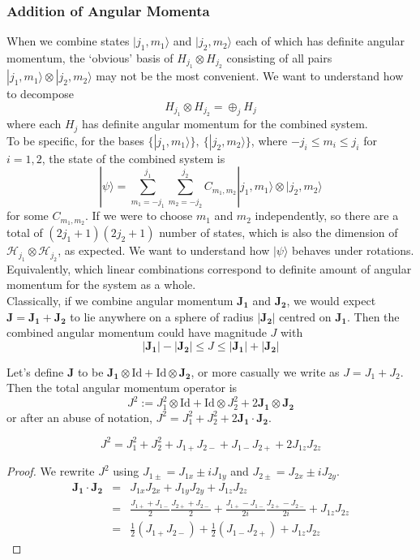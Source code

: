 \documentclass[a4paper]{article}
\begin{document}
\subsubsection*{Addition of Angular Momenta}
When we combine states $|j_1,m_1\rangle$ and $|j_2,m_2\rangle$ each of which has definite angular momentum, the `obvious' basis of $H_{j_1}\otimes H_{j_2}$ consisting of all pairs $|j_1,m_1\rangle\otimes|j_2,m_2\rangle$ may not be the most convenient. We want to understand how to decompose $$H_{j_1}\otimes H_{j_2}=\oplus_jH_j$$ where each $H_j$ has definite angular momentum for the combined system.\\[5pt]
To be specific, for the bases  $\{|j_1,m_1\rangle\},~\{|j_2,m_2\rangle\}$, where $-j_i\leq m_i\leq j_i$ for $i=1,2$, the state of the combined system is
$$|\psi\rangle=\sum_{m_1=-j_1}^{j_1}\sum_{m_2=-j_2}^{j_2}C_{m_1,m_2}|j_1,m_1\rangle\otimes|j_2,m_2\rangle$$
for some $C_{m_1,m_2}$. If we were to choose $m_1$ and $m_2$ independently, so there are a total of $(2j_1+1)(2j_2+1)$ number of states, which is also the dimension of $\mathcal{H}_{j_1}\otimes\mathcal{H}_{j_2}$, as expected. We want to understand how $|\psi\rangle$ behaves under rotations. Equivalently, which linear combinations correspond to definite amount of angular momentum for the system as a whole.\\[5pt]
Classically, if we combine angular momentum $\mathbf{J_1}$ and $\mathbf{J_2}$, we would expect $\mathbf{J}=\mathbf{J_1}+\mathbf{J_2}$ to lie anywhere on a sphere of radius $|\mathbf{J_2}|$ centred on $\mathbf{J_1}$. Then the combined angular momentum could have magnitude $J$ with
$$|\mathbf{J_1}|-|\mathbf{J_2}|\leq J\leq|\mathbf{J_1}|+|\mathbf{J_2}|$$
\begin{defi}
Let's define $\mathbf{J}$ to be $\mathbf{J_1}\otimes\text{Id}+\text{Id}\otimes\mathbf{J_2}$, or more casually we write as $J=J_1+J_2$. Then the total angular momentum operator is
$$J^2:=J_1^2\otimes\text{Id}+\text{Id}\otimes J_2^2+2\mathbf{J_1}\otimes\mathbf{J_2}$$
or after an abuse of notation, $J^2=J_1^2+J_2^2+2\mathbf{J_1}\cdot\mathbf{J_2}$.
\end{defi}
\begin{prop}
$$J^2=J_1^2+J_2^2+J_{1+}J_{2-}+J_{1-}J_{2+}+2J_{1z}J_{2z}$$
\end{prop}
\begin{proof}
We rewrite $J^2$ using $J_{1\pm}=J_{1x}\pm iJ_{1y}$ and $J_{2\pm}=J_{2x}\pm i J_{2y}$.
\begin{eqnarray}
\mathbf{J_1}\cdot\mathbf{J_2}&=&J_{1x}J_{2x}+J_{1y}J_{2y}+J_{1z}J_{2z}\nonumber\\&=&\frac{J_{1+}+J_{1-}}{2}\frac{J_{2+}+J_{2-}}{2}+\frac{J_{1+}-J_{1-}}{2i}\frac{J_{2+}-J_{2-}}{2i}+J_{1z} J_{2z}\nonumber\\&=&\frac{1}{2}(J_{1+} J_{2-})+\frac{1}{2}(J_{1-} J_{2+})+J_{1z}J_{2z}\nonumber
\end{eqnarray}
\end{proof}
\end{document}
